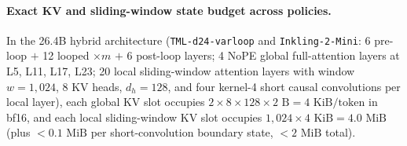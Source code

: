\documentclass[11pt]{article}
\begin{document}
\paragraph{Exact KV and sliding-window state budget across policies.}
In the 26.4B hybrid architecture (\texttt{TML-d24-varloop} and \texttt{Inkling-2-Mini}: 6 pre-loop $+$ 12 looped
$\times m$ $+$ 6 post-loop layers; 4 NoPE global full-attention layers at L5, L11, L17, L23; 20 local sliding-window
attention layers with window $w{=}1{,}024$, 8 KV heads, $d_h{=}128$, and four kernel-4 short causal convolutions per
local layer), each global KV slot occupies $2 \times 8 \times 128 \times 2\text{ B} = 4\text{ KiB/token}$ in bf16, and
each local sliding-window KV slot occupies $1{,}024 \times 4\text{ KiB} = 4.0\text{ MiB}$ (plus $<0.1\text{ MiB}$ per
short-convolution boundary state, $<2\text{ MiB}$ total).
\end{document}
